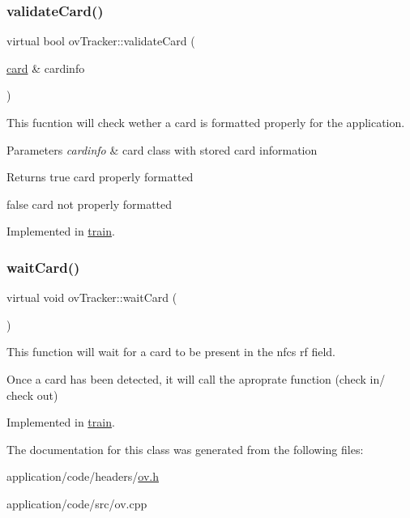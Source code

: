 \subsubsection{\texorpdfstring{validate\+Card()}{validateCard()}}
{\footnotesize\ttfamily virtual bool ov\+Tracker\+::validate\+Card (\begin{DoxyParamCaption}\item[{\hyperlink{classcard}{card} \&}]{cardinfo }\end{DoxyParamCaption})\hspace{0.3cm}{\ttfamily [pure virtual]}}



This fucntion will check wether a card is formatted properly for the application. 


\begin{DoxyParams}{Parameters}
{\em cardinfo} & card class with stored card information \\
\hline
\end{DoxyParams}
\begin{DoxyReturn}{Returns}
true card properly formatted 

false card not properly formatted 
\end{DoxyReturn}


Implemented in \hyperlink{classtrain_aa484ea80f6754481e8c566da13c72f82}{train}.

\mbox{\label{classovTracker_a43dea6c5e524377f2190e59a7da85b51}} 
\subsubsection{\texorpdfstring{wait\+Card()}{waitCard()}}
{\footnotesize\ttfamily virtual void ov\+Tracker\+::wait\+Card (\begin{DoxyParamCaption}{ }\end{DoxyParamCaption})\hspace{0.3cm}{\ttfamily [pure virtual]}}



This function will wait for a card to be present in the nfc\textquotesingle{}s rf field. 

Once a card has been detected, it will call the aproprate function (check in/ check out) 

Implemented in \hyperlink{classtrain_a4509fc35ff69717aab2636dd847981d4}{train}.



The documentation for this class was generated from the following files\+:\begin{DoxyCompactItemize}
\item 
application/code/headers/\hyperlink{ov_8h}{ov.\+h}\item 
application/code/src/ov.\+cpp\end{DoxyCompactItemize}
